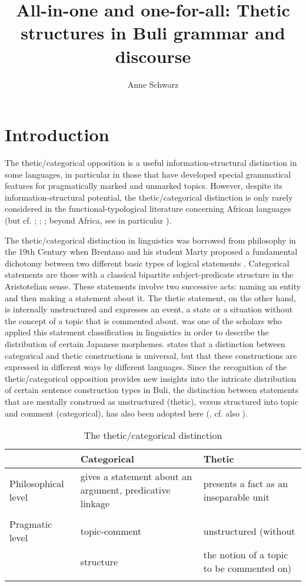 \documentclass[output=paper]{langsci/langscibook}
\title{All-in-one and one-for-all: Thetic structures in Buli grammar and discourse}
\author{%
 Anne Schwarz \affiliation{Universidad Regional Amazónica IKIAM}
}
\begin{document}
 

\section{Introduction}

The thetic/categorical opposition is a useful information-structural distinction in some languages, in particular in those that have developed special grammatical features for pragmatically marked and unmarked topics. However, despite its information-structural potential, the thetic/categorical distinction is only rarely considered in the functional-typological literature concerning African languages (but cf. \citealt{Güldemann1996,Güldemann2010,Güldemann2012}; \citealt[250-253]{FiedlerEtAl2010}; \citealt{Schwarz2010a}; beyond Africa, see in particular \citealt{Kuroda1972,Sasse1987,Sasse1995,Lambrecht1987,Lambrecht2000,Ulrich1988}). 

The thetic/categorical distinction in linguistics was borrowed from philosophy in the 19th Century when Brentano and his student Marty proposed a fundamental dichotomy between two different basic types of logical statements \citep[535]{Sasse1987}. Categorical statements are those with a classical bipartite subject-predicate structure in the Aristotelian sense. These statements involve two successive acts: naming an entity and then making a statement about it. The thetic statement, on the other hand, is internally unstructured and expresses an event, a state or a situation without the concept of a topic that is commented about. \citet{Kuroda1972} was one of the scholars who applied this statement classification in linguistics in order to describe the distribution of certain Japanese morphemes. \citet[388]{Ulrich1988} states that a distinction between categorical and thetic constructions is universal, but that these constructions are expressed in different ways by different languages. Since the recognition of the thetic/categorical opposition provides new insights into the intricate distribution of certain sentence construction types in Buli, the distinction between statements that are mentally construed as unstructured (thetic), versus structured into topic and comment (categorical), has also been adopted here (, cf. also \citealt{Ulrich1988}). 
 
\begin{table}
\caption{The thetic/categorical distinction}
\label{tab:Schwarz:1}

\begin{tabularx}{\textwidth}{XXX}
\lsptoprule
 & { {Categorical}} & { {Thetic} }\\
\midrule
{ {Philosophical level}} & {gives a statement about an argument, predicative linkage}  & {presents a fact as an inseparable unit}\\
\\
{ {Pragmatic level} } & {topic-comment} & {unstructured (without}\\
  & {structure} & {the notion of a topic to be commented on)}\\
\lspbottomrule
\end{tabularx}
\end{table} 
\end{document}
